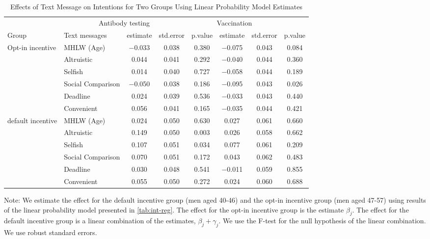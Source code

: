 \begin{table}

\caption{Effects of Text Message on Intentions for Two Groups Using Linear Probability Model Estimates \label{tab:int-reg-ftest}}
\centering
\fontsize{9}{11}\selectfont
\begin{threeparttable}
\begin{tabular}[t]{>{\raggedright\arraybackslash}p{5em}lcccccc}
\toprule
\multicolumn{2}{c}{ } & \multicolumn{3}{c}{Antibody testing} & \multicolumn{3}{c}{Vaccination} \\
\cmidrule(l{3pt}r{3pt}){3-5} \cmidrule(l{3pt}r{3pt}){6-8}
Group & Text messages & estimate & std.error & p.value & estimate  & std.error  & p.value \\
\midrule
Opt-in incentive & MHLW (Age) & \num{-0.033} & \num{0.038} & \num{0.380} & \num{-0.075} & \num{0.043} & \num{0.084}\\
 & Altruistic & \num{0.044} & \num{0.041} & \num{0.292} & \num{-0.040} & \num{0.044} & \num{0.360}\\
 & Selfish & \num{0.014} & \num{0.040} & \num{0.727} & \num{-0.058} & \num{0.044} & \num{0.189}\\
 & Social Comparison & \num{-0.050} & \num{0.038} & \num{0.186} & \num{-0.095} & \num{0.043} & \num{0.026}\\
 & Deadline & \num{0.024} & \num{0.039} & \num{0.536} & \num{-0.033} & \num{0.043} & \num{0.440}\\
 & Convenient & \num{0.056} & \num{0.041} & \num{0.165} & \num{-0.035} & \num{0.044} & \num{0.421}\\
default incentive & MHLW (Age) & \num{0.024} & \num{0.050} & \num{0.630} & \num{0.027} & \num{0.061} & \num{0.660}\\
 & Altruistic & \num{0.149} & \num{0.050} & \num{0.003} & \num{0.026} & \num{0.058} & \num{0.662}\\
 & Selfish & \num{0.107} & \num{0.051} & \num{0.034} & \num{0.077} & \num{0.061} & \num{0.209}\\
 & Social Comparison & \num{0.070} & \num{0.051} & \num{0.172} & \num{0.043} & \num{0.062} & \num{0.483}\\
 & Deadline & \num{0.030} & \num{0.048} & \num{0.541} & \num{-0.011} & \num{0.059} & \num{0.855}\\
 & Convenient & \num{0.055} & \num{0.050} & \num{0.272} & \num{0.024} & \num{0.060} & \num{0.688}\\
\bottomrule
\end{tabular}
\begin{tablenotes}
\item Note: We estimate the effect for the default incentive group (men aged 40-46) and the opt-in incentive group (men aged 47-57) using results of the linear probability model presented in \ref{tab:int-reg}. The effect for the opt-in incentive group is the estimate $\beta_j$. The effect for the default incentive group is a linear combination of the estimates, $\beta_j + \gamma_j$. We use the F-test for the null hypothesis of the linear combination. We use robust standard errors.
\end{tablenotes}
\end{threeparttable}
\end{table}
